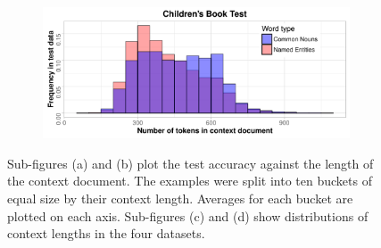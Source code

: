 \documentclass[11pt]{article}
\begin{document}
\begin{figure} [hpt]
\begin{subfigure}[b]{0.475\textwidth}
            \caption[]%
            {{}}    
            \label{fig:contextLength_cbt}
        \end{subfigure}
        \quad
        \begin{subfigure}[b]{0.475\textwidth}   
            \centering 
            \includegraphics[width=\textwidth]{CBT_contextLength_hist.pdf}
            \caption[]%
            {{}}    
            \label{fig:contextLength_cbt_hist}
        \end{subfigure}
        \caption[ The average and standard deviation of critical parameters ]{
        Sub-figures (a) and (b) plot the test accuracy against the length of the context document. The examples were split into ten buckets of equal size by their context length. Averages for each bucket are plotted on each axis. Sub-figures (c) and (d) show distributions of context lengths in the four datasets.}
        \label{fig:cnn+dm_lengthAcc}
\end{figure}
\end{document}
